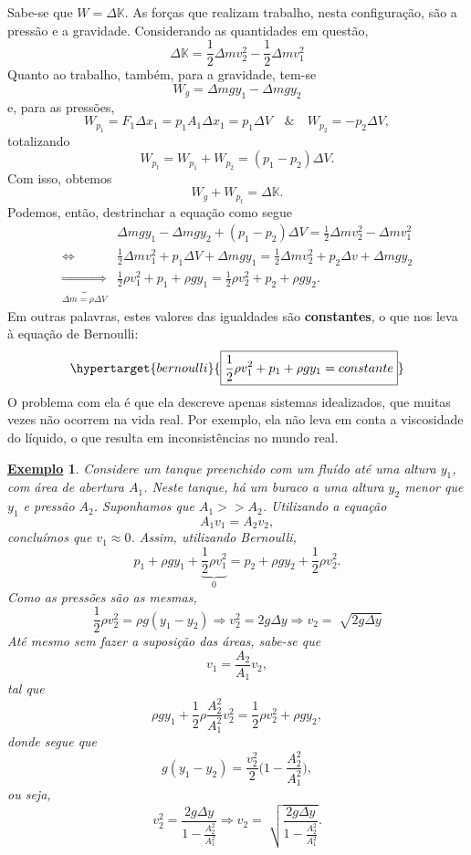 \documentclass{article}
\newtheorem{example}{\underline{Exemplo}}
\begin{document}
  Sabe-se que \(W = \Delta \mathbb{K}\). As forças que realizam trabalho, nesta configuração, são a pressão e a gravidade. Considerando as quantidades em questão, 
    \[
      \Delta \mathbb{K} = \frac{1}{2}\Delta m v_{2}^{2} - \frac{1}{2}\Delta m v_{1}^{2}
    \]
Quanto ao trabalho, também, para a gravidade, tem-se
\[
  W_{g} = \Delta mgy_{1} - \Delta mgy_{2}
\]
e, para as pressões, 
  \[
    W_{p_{1}} = F_{1}\Delta x_{1} = p_{1}A_{1}\Delta x_{1} = p_{1}\Delta V\quad\&\quad W_{p_{2}} = -p_{2}\Delta V,
  \]
totalizando 
  \[
    W_{p_{t}} = W_{p_{1}} + W_{p_{2}} = (p_{1}-p_{2})\Delta V.
  \]
  Com isso, obtemos 
  \[
    W_{g}+W_{p_{t}} = \Delta \mathbb{K}.
  \]
  Podemos, então, destrinchar a equação como segue
 \begin{align*}
   &\Delta mgy_{1}-\Delta mgy_{2} + (p_{1}-p_{2})\Delta V = \frac{1}{2}\Delta mv_{2}^{2}-\Delta mv_{1}^{2}\\
  \Longleftrightarrow\quad  & \frac{1}{2}\Delta mv_{1}^{2} + p_{1}\Delta V + \Delta mgy_{1} = \frac{1}{2}\Delta mv_{2}^{2} + p_{2}\Delta v + \Delta mgy_{2}\\
  \underbrace{\Longrightarrow}_{\Delta m=\rho \Delta V}         & \frac{1}{2}\rho v_{1}^{2} + p_{1} + \rho gy_{1} = \frac{1}{2}\rho v_{2}^{2} + p_{2} + \rho gy_{2}.
 \end{align*}
 Em outras palavras, estes valores das igualdades são \textbf{constantes}, o que nos leva à equação de Bernoulli: 
   \[
     \hypertarget{bernoulli}{\boxed{\frac{1}{2}\rho v_{1}^{2}+p_{1}+\rho gy_{1}=constante}}
   \]
   O problema com ela é que ela descreve apenas sistemas idealizados, que muitas vezes não ocorrem na vida real. Por exemplo, 
ela não leva em conta a viscosidade do líquido, o que resulta em inconsistências no mundo real.
\begin{example}
  Considere um tanque preenchido com um fluído até uma altura \(y_{1}\), com área de abertura \(A_{1}\). Neste tanque, há um buraco
 a uma altura \(y_{2}\) menor que \(y_{1}\) e pressão \(A_{2}\). Suponhamos que \(A_{1}>> A_{2}\). Utilizando a equação 
   \[
     A_{1}v_{1} = A_{2}v_{2},
   \]
  concluímos que \(v_{1}\approx0\). Assim, utilizando Bernoulli, 
    \[
      p_{1} + \rho gy_{1} + \underbrace{\frac{1}{2}\rho v_{1}^{2}}_{0} = p_{2} + \rho gy_{2} + \frac{1}{2}\rho v_{2}^{2}. 
    \]
  Como as pressões são as mesmas, 
    \[
      \frac{1}{2}\rho v_{2}^{2} = \rho g(y_{1}-y_{2}) \Rightarrow v_{2}^{2} = 2g\Delta y \Rightarrow v_{2}=\sqrt[]{2g\Delta y}
    \]
  Até mesmo sem fazer a suposição das áreas, sabe-se que 
    \[
      v_{1} = \frac{A_{2}}{A_{1}}v_{2},
    \]
  tal que 
    \[
      \rho gy_{1} + \frac{1}{2}\rho \frac{A_{2}^{2}}{A_{1}^{2}}v_{2}^{2} = \frac{1}{2}\rho v_{2}^{2} + \rho gy_{2},
    \]
  donde segue que 
    \[
      g(y_{1}-y_{2}) = \frac{v_{2}^{2}}{2}\biggl(1-\frac{A_{2}^{2}}{A_{1}^{2}}\biggr),
    \]
  ou seja, 
    \[
      v_{2}^{2} = \frac{2g\Delta y}{1-\frac{A_{2}^{2}}{A_{1}^{2}}} \Rightarrow v_{2} = \sqrt[]{\frac{2g\Delta y}{1-\frac{A_{2}^{2}}{A_{1}^{2}}}}.
    \]
\end{example}
\end{document}
